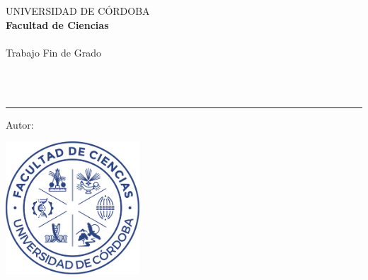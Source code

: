 \AddToShipoutPicture*{\BackgroundPic}
\begin{titlepage}
    \begin{center}
        \Large UNIVERSIDAD DE CÓRDOBA\\[0.5 cm]
        \large  \textbf{Facultad de Ciencias}\\[1.25 cm]
        \large \textbf{\titulacion}\\[1.25 cm]
        \Large  Trabajo Fin de Grado\\[2.25 cm]
        \Huge   \titulo
    \end{center}
    \vspace{1.25cm}
    \\[0.3cm]
    \\[0.5cm]
    {\color{blue}\hrule}
    \vspace{0.5cm}
    \noindent \Large{Autor: \autor}
    \vfill
    \begin{center}
        \includegraphics[width=5cm]{img/logo_ciencias.png}
    \end{center}
    \vfill
    \rightline{\fecha}
\end{titlepage}

